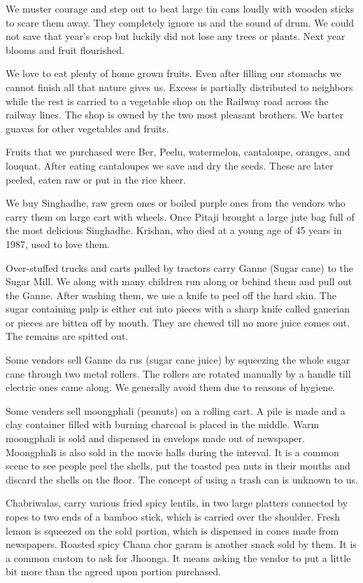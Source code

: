 We muster courage and step out to beat large tin cans loudly with wooden
sticks to scare them away. They completely ignore us and the sound of
drum. We could not save that year's crop but luckily did not lose any
trees or plants. Next year blooms and fruit flourished. 

We love to eat plenty of home grown fruits. Even after filling our
stomachs we cannot finish all that nature gives us. Excess is partially
distributed to neighbors while the rest is carried to a vegetable shop on
the Railway road across the railway lines. The shop is owned by the two
most pleasant brothers. We barter guavas for other vegetables and fruits. 

Fruits that we purchased were Ber, Peelu, watermelon, cantaloupe, oranges,
and louquat. After eating cantaloupes we save and dry the seeds. These are
later peeled, eaten raw or put in the rice kheer. 

We buy Singhadhe, raw green ones or boiled purple ones from the vendors
who carry them on large cart with wheels. Once Pitaji brought a large jute
bag full of the most delicious Singhadhe. Krishan, who died at a young age
of 45 years in 1987, used to love them. 

Over-stuffed trucks and carts pulled by tractors carry Ganne (Sugar cane)
to the Sugar Mill. We along with many children run along or behind them
and pull out the Ganne. After washing them, we use a knife to peel off the
hard skin. The sugar containing pulp is either cut into pieces with
a sharp knife called ganerian or pieces are bitten off by mouth. They are
chewed till no more juice comes out. The remains are spitted out. 

Some vendors sell Ganne da rus (sugar cane juice) by squeezing the whole
sugar cane through two metal rollers. The rollers are rotated manually by
a handle till electric ones came along. We generally avoid them due to
reasons of hygiene. 

Some venders sell moongphali (peanuts) on a rolling cart. A pile is made
and a clay container filled with burning charcoal is placed in the middle.
Warm moongphali is sold and dispensed in envelops made out of newspaper.
Moongphali is also sold in the movie halls during the interval. It is
a common scene to see people peel the shells, put the toasted pea nuts in
their mouths and discard the shells on the floor. The concept of using
a trash can is unknown to us. 

Chabriwalas, carry various fried spicy lentils, in two large platters
connected by ropes to two ends of a bamboo stick, which is carried over
the shoulder. Fresh lemon is squeezed on the sold portion, which is
dispensed in cones made from newspapers. Roasted spicy Chana chor garam is
another snack sold by them. It is a common custom to ask for Jhoonga. It
means asking the vendor to put a little bit more than the agreed upon
portion purchased. 

